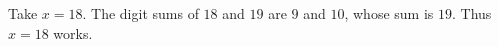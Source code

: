 Take $x=18$. The digit sums of $18$ and $19$ are $9$ and $10$, whose sum is $19$. Thus $\boxed{x=18}$ works.
